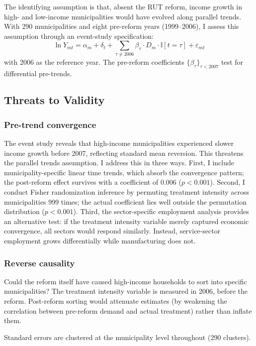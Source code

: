 \documentclass[12pt]{article}
\newcommand{\ind}{\mathbb{I}}
\begin{document}
The identifying assumption is that, absent the RUT reform, income growth in high- and low-income municipalities would have evolved along parallel trends. With 290 municipalities and eight pre-reform years (1999--2006), I assess this assumption through an event-study specification:
\begin{equation}
\ln Y_{mt} = \alpha_m + \delta_t + \sum_{\tau \neq 2006} \beta_\tau \cdot D_m \cdot \ind[t = \tau] + \varepsilon_{mt}
\label{eq:eventstudy}
\end{equation}
with 2006 as the reference year. The pre-reform coefficients $\{\beta_\tau\}_{\tau < 2007}$ test for differential pre-trends.

\subsection{Threats to Validity}

\subsubsection*{Pre-trend convergence} The event study reveals that high-income municipalities experienced slower income growth before 2007, reflecting standard mean reversion. This threatens the parallel trends assumption. I address this in three ways. First, I include municipality-specific linear time trends, which absorb the convergence pattern; the post-reform effect survives with a coefficient of 0.006 ($p < 0.001$). Second, I conduct Fisher randomization inference by permuting treatment intensity across municipalities 999 times; the actual coefficient lies well outside the permutation distribution ($p < 0.001$). Third, the sector-specific employment analysis provides an alternative test: if the treatment intensity variable merely captured economic convergence, all sectors would respond similarly. Instead, service-sector employment grows differentially while manufacturing does not.

\subsubsection*{Reverse causality} Could the reform itself have caused high-income households to sort into specific municipalities? The treatment intensity variable is measured in 2006, before the reform. Post-reform sorting would attenuate estimates (by weakening the correlation between pre-reform demand and actual treatment) rather than inflate them.

Standard errors are clustered at the municipality level throughout (290 clusters).
\end{document}
